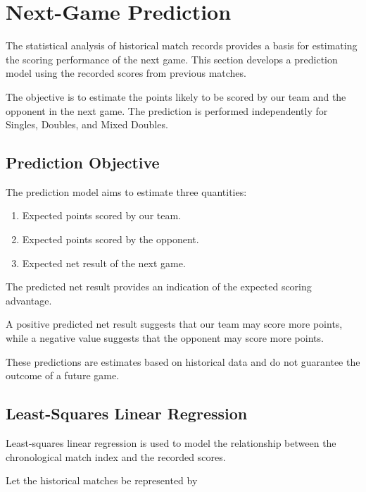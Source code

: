 
\section{Next-Game Prediction}

The statistical analysis of historical match records
provides a basis for estimating the scoring performance
of the next game. This section develops a prediction
model using the recorded scores from previous matches.

The objective is to estimate the points likely to be
scored by our team and the opponent in the next game.
The prediction is performed independently for Singles,
Doubles, and Mixed Doubles.

\subsection{Prediction Objective}

The prediction model aims to estimate three quantities:

\begin{enumerate}
    \item Expected points scored by our team.
    \item Expected points scored by the opponent.
    \item Expected net result of the next game.
\end{enumerate}

The predicted net result provides an indication of
the expected scoring advantage.

A positive predicted net result suggests that our
team may score more points, while a negative value
suggests that the opponent may score more points.

These predictions are estimates based on historical
data and do not guarantee the outcome of a future game.

\subsection{Least-Squares Linear Regression}

Least-squares linear regression is used to model the
relationship between the chronological match index
and the recorded scores.

Let the historical matches be represented by

